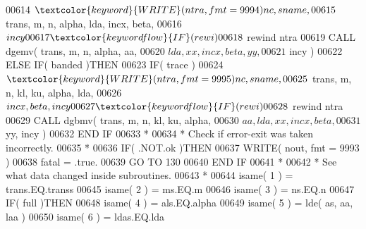 \begin{DoxyCode}
00614      $                              \textcolor{keyword}{WRITE}( ntra, fmt = 9994 )nc, sname,
00615      $                              trans, m, n, alpha, lda, incx, beta,
00616      $                              incy
00617                                  \textcolor{keywordflow}{IF}( rewi )
00618      $                              rewind ntra
00619                                  \textcolor{keyword}{CALL }dgemv( trans, m, n, alpha, aa,
00620      $                                       lda, xx, incx, beta, yy,
00621      $                                       incy )
00622                               \textcolor{keywordflow}{ELSE} \textcolor{keywordflow}{IF}( banded )\textcolor{keywordflow}{THEN}
00623                                  \textcolor{keywordflow}{IF}( trace )
00624      $                              \textcolor{keyword}{WRITE}( ntra, fmt = 9995 )nc, sname,
00625      $                              trans, m, n, kl, ku, alpha, lda,
00626      $                              incx, beta, incy
00627                                  \textcolor{keywordflow}{IF}( rewi )
00628      $                              rewind ntra
00629                                  \textcolor{keyword}{CALL }dgbmv( trans, m, n, kl, ku, alpha,
00630      $                                       aa, lda, xx, incx, beta,
00631      $                                       yy, incy )
00632 \textcolor{keywordflow}{                              END IF}
00633 \textcolor{comment}{*}
00634 \textcolor{comment}{*                             Check if error-exit was taken incorrectly.}
00635 \textcolor{comment}{*}
00636                               \textcolor{keywordflow}{IF}( .NOT.ok )\textcolor{keywordflow}{THEN}
00637                                  \textcolor{keyword}{WRITE}( nout, fmt = 9993 )
00638                                  fatal = .true.
00639                                  \textcolor{keywordflow}{GO TO} 130
00640 \textcolor{keywordflow}{                              END IF}
00641 \textcolor{comment}{*}
00642 \textcolor{comment}{*                             See what data changed inside subroutines.}
00643 \textcolor{comment}{*}
00644                               isame( 1 ) = trans.EQ.transs
00645                               isame( 2 ) = ms.EQ.m
00646                               isame( 3 ) = ns.EQ.n
00647                               \textcolor{keywordflow}{IF}( full )\textcolor{keywordflow}{THEN}
00648                                  isame( 4 ) = als.EQ.alpha
00649                                  isame( 5 ) = lde( as, aa, laa )
00650                                  isame( 6 ) = ldas.EQ.lda

\end{DoxyCode}

